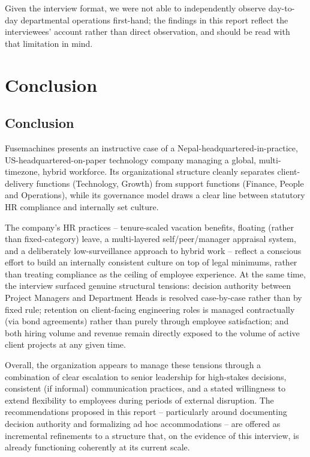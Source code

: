 \documentclass[12pt,a4paper]{report}
\begin{document}
Given the interview format, we were not able to independently observe day-to-day departmental operations first-hand; the findings in this report reflect the interviewees' account rather than direct observation, and should be read with that limitation in mind.

\chapter{Conclusion}

\section{Conclusion}

Fusemachines presents an instructive case of a Nepal-headquartered-in-practice, US-headquartered-on-paper technology company managing a global, multi-timezone, hybrid workforce. Its organizational structure cleanly separates client-delivery functions (Technology, Growth) from support functions (Finance, People and Operations), while its governance model draws a clear line between statutory HR compliance and internally set culture.

The company's HR practices -- tenure-scaled vacation benefits, floating (rather than fixed-category) leave, a multi-layered self/peer/manager appraisal system, and a deliberately low-surveillance approach to hybrid work -- reflect a conscious effort to build an internally consistent culture on top of legal minimums, rather than treating compliance as the ceiling of employee experience. At the same time, the interview surfaced genuine structural tensions: decision authority between Project Managers and Department Heads is resolved case-by-case rather than by fixed rule; retention on client-facing engineering roles is managed contractually (via bond agreements) rather than purely through employee satisfaction; and both hiring volume and revenue remain directly exposed to the volume of active client projects at any given time.

Overall, the organization appears to manage these tensions through a combination of clear escalation to senior leadership for high-stakes decisions, consistent (if informal) communication practices, and a stated willingness to extend flexibility to employees during periods of external disruption. The recommendations proposed in this report -- particularly around documenting decision authority and formalizing ad hoc accommodations -- are offered as incremental refinements to a structure that, on the evidence of this interview, is already functioning coherently at its current scale.
\end{document}
